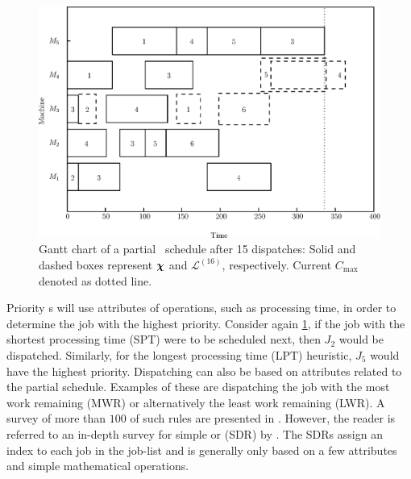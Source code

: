 \documentclass[twocolumn]{svjour3}
\begin{document}
\begin{figure}[t!]\centering
\includegraphics[width=\columnwidth]{figures/jssp_example}
\caption[Gantt chart of a partial \JSP\ schedule]{Gantt chart of a
partial \JSP\ schedule after 15 dispatches: Solid and dashed boxes
represent $\bm \chi$ and $\mathcal{L}^{(16)}$, respectively. Current
$C_{\max}$ denoted as dotted line.}
\label{fig:jssp:example}
\end{figure}


Priority \dr s will use attributes of operations, such as processing time, 
in order to determine the job with the highest priority. 
Consider again \cref{fig:jssp:example}, if the job with the shortest processing 
time (SPT) were to be scheduled next, then $J_2$ would be dispatched. 
Similarly, for the longest processing time (LPT) heuristic, $J_5$ would have 
the highest priority. 
Dispatching can also be based on attributes related to the partial schedule. 
Examples of these are dispatching the job with the most work remaining (MWR) or 
alternatively the least work remaining (LWR). A survey of more than $100$ of 
such rules are presented in \cite{Panwalkar77}. 
However, the reader is referred to an in-depth survey for simple or 
\emph{\sdr} (SDR) by \cite{Haupt89}.  
The SDRs assign an index to each job in the job-list and is generally only 
based on a few attributes and simple mathematical operations.
\end{document}
